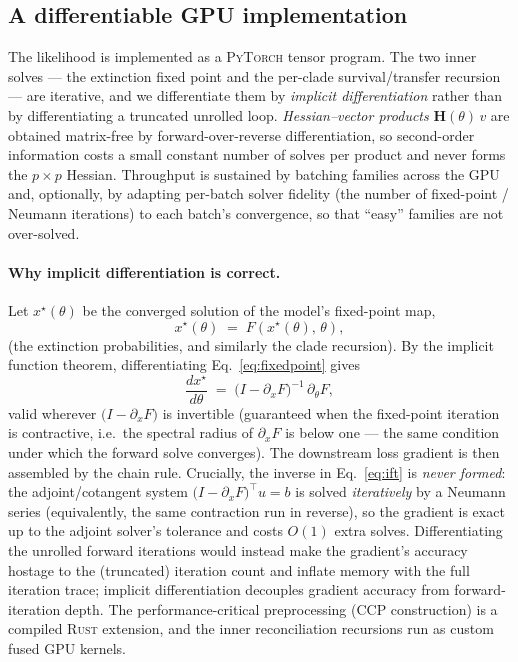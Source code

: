 \documentclass[11pt]{article}
\newcommand{\Hess}{\mathbf{H}}
\begin{document}
\subsection{A differentiable GPU implementation}
\label{sec:autodiff}
The likelihood is implemented as a \textsc{PyTorch} \citep{Paszke2019} tensor program. The two
inner solves --- the extinction fixed point and the per-clade survival/transfer
recursion --- are iterative, and we differentiate them by \emph{implicit
differentiation} rather than by differentiating a truncated unrolled loop.
\emph{Hessian--vector products} $\Hess(\theta)\,v$ are obtained matrix-free by
forward-over-reverse differentiation, so second-order information costs a small
constant number of solves per product and never forms the $p\times p$ Hessian.
Throughput is sustained by batching families across the GPU and, optionally, by
adapting per-batch solver fidelity (the number of fixed-point / Neumann
iterations) to each batch's convergence, so that ``easy'' families are not
over-solved.

\paragraph{Why implicit differentiation is correct.} Let $x^\star(\theta)$ be
the converged solution of the model's fixed-point map,
\begin{equation}
  x^\star(\theta) \;=\; F\!\left(x^\star(\theta),\,\theta\right),
  \label{eq:fixedpoint}
\end{equation}
(the extinction probabilities, and similarly the clade recursion). By the
implicit function theorem, differentiating Eq.~\eqref{eq:fixedpoint} gives
\begin{equation}
  \frac{d x^\star}{d\theta}
   \;=\; \bigl(I-\partial_x F\bigr)^{-1}\,\partial_\theta F ,
  \label{eq:ift}
\end{equation}
valid wherever $\bigl(I-\partial_x F\bigr)$ is invertible (guaranteed when the
fixed-point iteration is contractive, i.e.\ the spectral radius of
$\partial_x F$ is below one --- the same condition under which the forward solve
converges). The downstream loss gradient is then assembled by the chain rule.
Crucially, the inverse in Eq.~\eqref{eq:ift} is \emph{never formed}: the
adjoint/cotangent system $\bigl(I-\partial_x F\bigr)^{\!\top} u = b$ is solved
\emph{iteratively} by a Neumann series (equivalently, the same contraction run
in reverse), so the gradient is exact up to the adjoint solver's tolerance and
costs $O(1)$ extra solves. Differentiating the unrolled forward iterations would
instead make the gradient's accuracy hostage to the (truncated) iteration count
and inflate memory with the full iteration trace; implicit differentiation
decouples gradient accuracy from forward-iteration depth. The performance-critical
preprocessing (CCP construction) is a compiled \textsc{Rust} extension, and the
inner reconciliation recursions run as custom fused GPU kernels.
\end{document}
